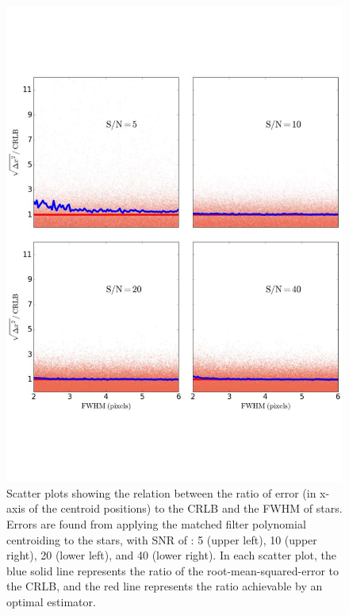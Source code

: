 \documentclass[onecolumn]{aastex61}
\newcommand{\todo}[1]{{\textcolor{dred}{ #1}}}
\begin{document}
\begin{figure}[p]~\\
\begin{center}
\includegraphics[width=0.65\linewidth]{new_fwhm_matchedfilter.pdf}
\caption{\todo{Scatter plots showing the relation between the ratio of error (in x-axis of the centroid positions) to the CRLB and the FWHM of stars.
Errors are found from applying the matched filter polynomial centroiding to the stars, with SNR  of : 5 (upper left), 10 (upper right), 20 (lower left), and 40 (lower right). In each scatter plot, the blue solid line represents the ratio of the root-mean-squared-error to the CRLB, and the red line represents the ratio achievable by an optimal estimator.}}\label{6}
\end{center}
\end{figure}
\end{document}
